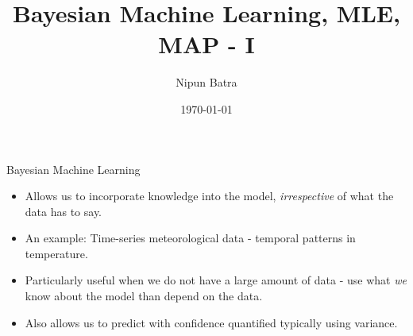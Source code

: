 \documentclass{beamer}
\title{Bayesian Machine Learning, MLE, MAP - I}
\date{\today}
\author{Nipun Batra}
\institute{IIT Gandhinagar}
\begin{document}
\maketitle

\begin{frame}{Bayesian Machine Learning}
\begin{itemize}[<+->]
\item Allows us to incorporate knowledge into the model, \emph{irrespective} of what the data has to say. 
\item An example: Time-series meteorological data - temporal patterns in temperature.
\item Particularly useful when we do not have a large amount of data - use what \emph{we} know about the model than depend on the data.
\item Also allows us to predict with confidence quantified typically using variance.
\end{itemize}
\end{frame}



 
 
  
  

	
	
	
\end{document}

